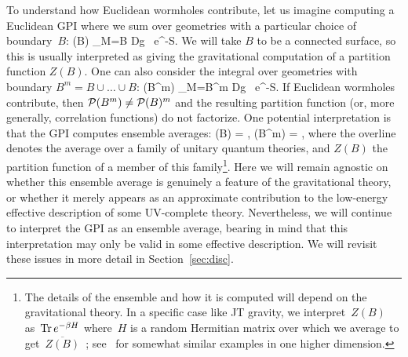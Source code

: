 \documentclass[12pt]{article}
\begin{document}
To understand how Euclidean wormholes contribute, let us imagine computing a Euclidean GPI where we sum over geometries with a particular choice of boundary~$B$:
\be
\Pcal(B) \equiv \int_{\partial M=B} Dg \, e^{-S}.
\ee
We will take $B$ to be a connected surface, so this is usually interpreted as giving the gravitational computation of a partition function $Z(B)$.  One can also consider the integral over geometries with boundary $B^m = B \cup \dots \cup B$:
\be
\Pcal(B^m) \equiv \int_{\partial M=B^m} Dg \, e^{-S}.
\ee
If Euclidean wormholes contribute, then $\mathcal{P}(B^m) \ne \mathcal{P}(B)^m$ and the resulting partition function (or, more generally, correlation functions) do not factorize. 
One potential interpretation is that the GPI computes ensemble averages:
\be
\label{eq:GPIaverage}
\Pcal(B) = , \qquad \Pcal(B^m) = ,
\ee
where the overline denotes the average over a family of unitary quantum theories, and $Z(B)$ the partition function of a member of this family\footnote{The details of the ensemble and how it is computed will depend on the gravitational theory.
In a specific case like JT gravity, we interpret~$Z(B)$ as~$\operatorname{Tr} e^{-\beta H}$ where~$H$ is a random Hermitian matrix over which we average to get~$\overline{Z(B)}$~\cite{SSS}; see~\cite{MalWit20,PerTro20,CotJen20} for somewhat similar examples in one higher dimension.}.  Here we will remain agnostic on whether this ensemble average is genuinely a feature of the gravitational theory, or whether it merely appears as an approximate contribution to the low-energy effective description of some UV-complete theory.  Nevertheless, we will continue to interpret the GPI as an ensemble average, bearing in mind that this interpretation may only be valid in some effective description.  We will revisit these issues in more detail in Section~\ref{sec:disc}.
\end{document}
